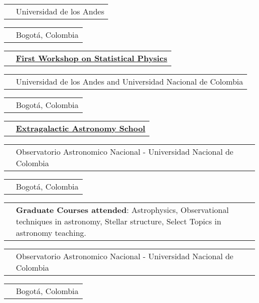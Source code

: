 \documentclass[11pt,letterpaper,sans]{moderncv}        %
\makeatletter
\renewcommand*{\cvitem}[3][.25em]{%
  \begin{tabular}{@{}p{\hintscolumnwidth}@{\hspace{\separatorcolumnwidth}}p{\maincolumnwidth}@{}}%
      \raggedleft\hintstyle{#2} &{#3}%
  \end{tabular}%
  \par\addvspace{#1}}
\makeatother
\begin{document}
\cvitem{2012}{Universidad de los Andes}
\cvitem{}{Bogot\'a, Colombia}
\cvitem{Sept 12 - 16}{\href{http://www.ciencias.unal.edu.co/workshopstatisticalphysics/}{\textbf{First Workshop on Statistical Physics}}}
\cvitem{2011}{Universidad de los Andes and Universidad Nacional de Colombia}
\cvitem{}{Bogot\'a, Colombia}
\cvitem{Aug 9 - 11}{\href{http://www.observatorio.unal.edu.co/eventos/pasados/cocoa/escuela.html}{\textbf{Extragalactic Astronomy School}}}
\cvitem{2010}{Observatorio Astronomico Nacional - Universidad Nacional de Colombia}
\cvitem{}{Bogot\'a, Colombia}
\cvitem{2012 -2013}{\textbf{Graduate Courses attended}: Astrophysics, Observational techniques in astronomy, Stellar structure, Select Topics in astronomy teaching.}
\cvitem{}{Observatorio Astronomico Nacional - Universidad Nacional de Colombia}
\cvitem{}{Bogot\'a, Colombia}
\end{document}
